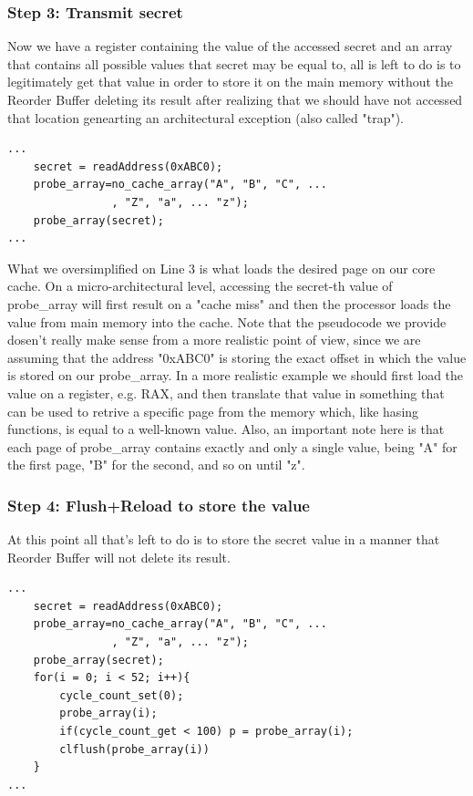 \subsubsection{Step 3: Transmit secret}
Now we have a register containing the value of the accessed secret and an array that contains all possible values that secret may be equal to,
all is left to do is to legitimately get that value in order to store it on the main memory without the Reorder Buffer deleting its result
after realizing that we should have not accessed that location genearting an architectural exception (also called "trap").

\begin{Verbatim}[fontsize=\small]
...
    secret = readAddress(0xABC0);
    probe_array=no_cache_array("A", "B", "C", ... 
                , "Z", "a", ... "z");
    probe_array(secret);
...
\end{Verbatim}

What we oversimplified on Line 3 is what loads the desired page on our core cache. On a micro-architectural level, accessing the secret-th value of probe\_array
will first result on a "cache miss" and then the processor loads the value from main memory into the cache.
Note that the pseudocode we provide dosen't really make sense from a more realistic point of view, since we are assuming that the address "0xABC0" is storing the exact
offset in which the value is stored on our probe\_array. In a more realistic example we should first load the value on a register, e.g. RAX,
and then translate that value in something that can be used to retrive a specific page from the memory which,
like hasing functions, is equal to a well-known value. Also, an important note here is that each page
of probe\_array contains exactly and only a single value, being "A" for the first page, "B" for the second, and so on until "z".

\subsubsection{Step 4: Flush+Reload to store the value}
At this point all that's left to do is to store the secret value in a manner that Reorder Buffer will not delete its result.
\begin{Verbatim}[fontsize=\small]
...
    secret = readAddress(0xABC0);
    probe_array=no_cache_array("A", "B", "C", ... 
                , "Z", "a", ... "z");
    probe_array(secret);
    for(i = 0; i < 52; i++){
        cycle_count_set(0);
        probe_array(i);
        if(cycle_count_get < 100) p = probe_array(i);
        clflush(probe_array(i))
    }
...
\end{Verbatim}

